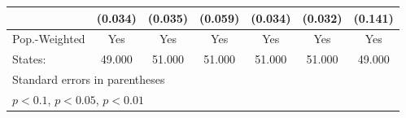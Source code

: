 {\begin{tabular}{l*{6}{c}}
            &     (0.034)         &     (0.035)         &     (0.059)         &     (0.034)         &     (0.032)         &     (0.141)         \\
\hline
Pop.-Weighted&         Yes         &         Yes         &         Yes         &         Yes         &         Yes         &         Yes         \\
States:     &      49.000         &      51.000         &      51.000         &      51.000         &      51.000         &      49.000         \\
\hline\hline
\multicolumn{7}{l}{\footnotesize Standard errors in parentheses}\\
\multicolumn{7}{l}{\footnotesize \sym{*} \(p<0.1\), \sym{**} \(p<0.05\), \sym{***} \(p<0.01\)}\\
\end{tabular}
}
